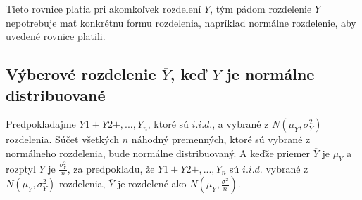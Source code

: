 \documentclass[]{tukediphc}
\begin{document}
Tieto rovnice platia pri akomkoľvek rozdelení $Y$, tým pádom rozdelenie $Y$ nepotrebuje mať konkrétnu formu rozdelenia, napríklad normálne rozdelenie, aby uvedené rovnice platili.  

\subsection{Výberové rozdelenie $\overline{Y}$, keď $Y$ je normálne distribuované}

Predpokladajme $Y1 + Y2 +, ..., Y_n$, ktoré sú $i.i.d.$, a vybrané z $N(\mu_{Y}, \sigma^2_{Y})$ rozdelenia. Súčet všetkých $n$ náhodný premenných, ktoré sú vybrané z normálneho rozdelenia, bude normálne distribuovaný. A keďže priemer $\overline{Y}$ je $\mu_{Y}$ a rozptyl $\overline{Y}$ je $\frac{\sigma^2_Y}{n}$, za predpokladu, že $Y1 + Y2 +, ..., Y_n$ sú $i.i.d.$ vybrané z $N(\mu_{Y}, \sigma^2_{Y})$ rozdelenia, $\overline{Y}$ je rozdelené ako $N(\mu_{Y}, \frac{\sigma^2}{n})$.  










%

%

%

%

%

%

%
\newpage
{}
\protect\label{page:posledna}
\end{document}

